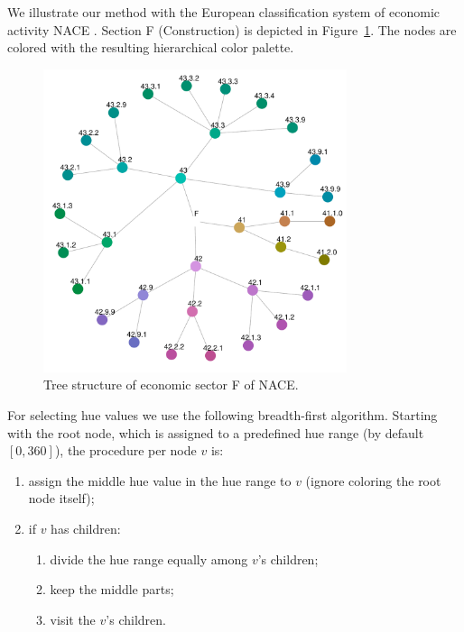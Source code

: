 \documentclass[review]{vgtc}                 %
\begin{document}
We illustrate our method with the European classification system of economic activity NACE \cite{nace}. Section F (Construction) is depicted in Figure~\ref{fig:sbiF}. The nodes are colored with the resulting hierarchical color palette. 

\begin{figure}[htb]
  \centering
  \includegraphics[width=3.5in]{sbi_F.pdf}
  \caption{Tree structure of economic sector F of NACE.}\label{fig:sbiF}
\end{figure}

For selecting hue values we use the following breadth-first algorithm. Starting with the root node, which is assigned to a predefined hue range (by default $[0, 360]$), the procedure per node $v$ is: 
\begin{enumerate} \itemsep1pt \parskip0pt 
\item assign the middle hue value in the hue range to $v$ (ignore coloring the root node itself);
\item if $v$ has children:
\begin{enumerate} \itemsep1pt \parskip0pt 
\item divide the hue range equally among $v$'s children;
\item keep the middle parts;
\item visit the $v$'s children.
\end{enumerate}
\end{enumerate}
\end{document}
